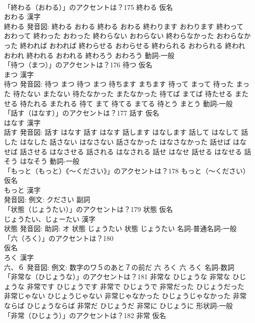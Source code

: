 \documentclass[8pt]{extreport}
\begin{document}
\begin{CJK}{UTF8}{min}
\\	「終わる（おわる）」のアクセントは？175	終わる 仮名　
\\	おわる 漢字　
\\	終わる 発音図:	終わる おわる		終わる おわる 終わります おわります 終わって おわって 終わった おわった 終わらない おわらない 終わらなかった おわらなかった 終われば おわれば 終わらせる おわらせる 終わられる おわられる 終われ おわれ 終われる おわれる 終わろう おわろう				動詞-一般 
\\	「待つ（まつ）」のアクセントは？176	待つ 仮名　
\\	まつ 漢字　
\\	待つ 発音図:	待つ まつ		待つ まつ 待ちます まちます 待って まって 待った まった 待たない またない 待たなかった またなかった 待てば まてば 待たせる またせる 待たれる またれる 待て まて 待てる まてる 待とう まとう				動詞-一般 
\\	「話す（はなす）」のアクセントは？177	話す 仮名　
\\	はなす 漢字　
\\	話す 発音図:	話す はなす		話す はなす 話します はなします 話して はなして 話した はなした 話さない はなさない 話さなかった はなさなかった 話せば はなせば 話させる はなさせる 話される はなされる 話せ はなせ 話せる はなせる 話そう はなそう				動詞-一般 
\\	「もっと（もっと）《〜ください》」のアクセントは？178	もっと（〜ください） 仮名　
\\	もっと 漢字　
\\	発音図: 例文: クださい							副詞 
\\	「状態（じょうたい）」のアクセントは？179	状態 仮名　
\\	じょうたい、じょーたい 漢字　
\\	状態 発音図: 助詞: オ	状態 じょうたい		状態 じょうたい				名詞-普通名詞-一般 
\\	「六（ろく）」のアクセントは？180	
\\	仮名　
\\	ろく 漢字　
\\	六、６ 発音図: 例文: 数字のワ５のあと７の前だ	六 ろく		六 ろく				名詞-数詞 
\\	「非常な（ひじょうな）」のアクセントは？181		非常な ひじょうな		非常な ひじょうな 非常です ひじょうです 非常で ひじょうで 非常だった ひじょうだった 非常じゃない ひじょうじゃない 非常じゃなかった ひじょうじゃなかった 非常ならば ひじょうならば 非常だ ひじょうだ 非常に ひじょうに				形状詞-一般 
\\	「非常（ひじょう）」のアクセントは？182	非常 仮名　

\end{CJK}
\end{document}
